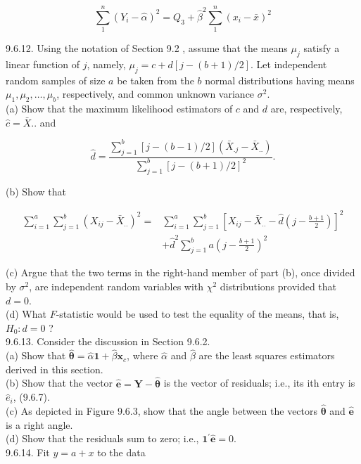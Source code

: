 $$
\sum_{1}^{n}\left(Y_{i}-\hat{\alpha}\right)^{2}=Q_{3}+\widehat{\beta}^{2} \sum_{1}^{n}\left(x_{i}-\bar{x}\right)^{2}
$$

9.6.12. Using the notation of Section 9.2 , assume that the means $\mu_{j}$ satisfy a linear function of $j$, namely, $\mu_{j}=c+d[j-(b+1) / 2]$. Let independent random samples of size $a$ be taken from the $b$ normal distributions having means $\mu_{1}, \mu_{2}, \ldots, \mu_{b}$, respectively, and common unknown variance $\sigma^{2}$.\\
(a) Show that the maximum likelihood estimators of $c$ and $d$ are, respectively, $\hat{c}=\bar{X}$.. and

$$
\hat{d}=\frac{\sum_{j=1}^{b}[j-(b-1) / 2]\left(\bar{X}_{. j}-\bar{X}_{. .}\right)}{\sum_{j=1}^{b}[j-(b+1) / 2]^{2}} .
$$

(b) Show that

$$
\begin{aligned}
\sum_{i=1}^{a} \sum_{j=1}^{b}\left(X_{i j}-\bar{X}_{. .}\right)^{2}= & \sum_{i=1}^{a} \sum_{j=1}^{b}\left[X_{i j}-\bar{X}_{. .}-\hat{d}\left(j-\frac{b+1}{2}\right)\right]^{2} \\
& +\hat{d}^{2} \sum_{j=1}^{b} a\left(j-\frac{b+1}{2}\right)^{2}
\end{aligned}
$$

(c) Argue that the two terms in the right-hand member of part (b), once divided by $\sigma^{2}$, are independent random variables with $\chi^{2}$ distributions provided that $d=0$.\\
(d) What $F$-statistic would be used to test the equality of the means, that is, $H_{0}: d=0$ ?\\
9.6.13. Consider the discussion in Section 9.6.2.\\
(a) Show that $\hat{\boldsymbol{\theta}}=\hat{\alpha} \mathbf{1}+\hat{\beta} \mathbf{x}_{c}$, where $\hat{\alpha}$ and $\hat{\beta}$ are the least squares estimators derived in this section.\\
(b) Show that the vector $\hat{\mathbf{e}}=\mathbf{Y}-\hat{\boldsymbol{\theta}}$ is the vector of residuals; i.e., its ith entry is $\hat{e}_{i}$, (9.6.7).\\
(c) As depicted in Figure 9.6.3, show that the angle between the vectors $\hat{\boldsymbol{\theta}}$ and $\hat{\mathbf{e}}$ is a right angle.\\
(d) Show that the residuals sum to zero; i.e., $\mathbf{1}^{\prime} \hat{\mathbf{e}}=0$.\\
9.6.14. Fit $y=a+x$ to the data

